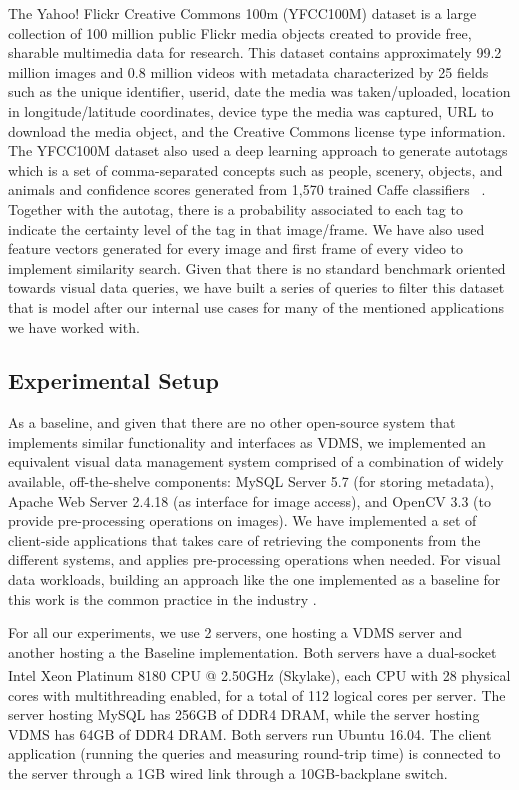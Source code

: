 The Yahoo! Flickr Creative Commons 100m (YFCC100M) dataset is a large
collection of 100 million public Flickr media objects created to provide free,
sharable multimedia data for research. This dataset contains approximately
99.2 million images and 0.8 million videos with metadata characterized by
25 fields such as the unique identifier, userid,
date the media was taken/uploaded, location in longitude/latitude coordinates,
device type the media was captured, URL to download the media object,
and the Creative Commons license type information.
The YFCC100M dataset also used a deep learning approach to generate autotags
which is a set of comma-separated concepts such as people, scenery, objects,
and animals and confidence scores generated from 1,570 trained
Caffe classifiers ~\cite{Thomee_2016}. Together with the autotag, there is a
probability associated to each tag to indicate the certainty level of the tag
in that image/frame.
We have also used feature vectors generated for every image and first frame
of every video \cite{features} to implement similarity search.
Given that there is no standard benchmark oriented towards visual data queries,
we have built a series of queries to filter this dataset that is model after
our internal use cases for many of the mentioned applications we have worked
with.


\subsection{Experimental Setup}

As a baseline, and given that there are no other open-source system
that implements similar functionality and interfaces as VDMS,
we implemented an equivalent visual data management system comprised of a
combination of widely available, off-the-shelve components:
MySQL Server 5.7 (for storing metadata),
Apache Web Server 2.4.18 (as interface for image access), and
OpenCV 3.3 (to provide pre-processing operations on images).
We have implemented a set of client-side applications that takes care
of retrieving the components from the different systems, and applies
pre-processing operations when needed.
For visual data workloads, building an approach like the one
implemented as a baseline for this work
is the common practice in the industry \cite{heystack, tao}.

For all our experiments, we use 2 servers, one hosting a VDMS server and
another hosting a the Baseline implementation.
Both servers have a dual-socket Intel\textsuperscript{\textregistered}
Xeon\textsuperscript{\textregistered} Platinum 8180 CPU @ 2.50GHz (Skylake),
each CPU with 28 physical cores with multithreading enabled,
for a total of 112 logical cores per server.
The server hosting MySQL has 256GB of DDR4 DRAM, while the server hosting VDMS
has 64GB of DDR4 DRAM. Both servers run Ubuntu 16.04.
The client application (running the queries and measuring round-trip time)
is connected to the server through a 1GB wired link through
a 10GB-backplane switch.

